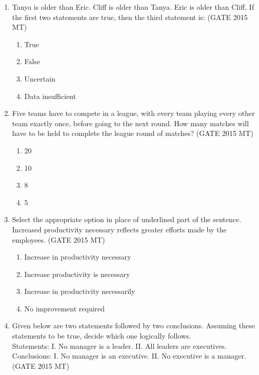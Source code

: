 \documentclass[12pt]{article}
\begin{document}
\begin{enumerate}
\item Tanya is older than Eric. Cliff is older than Tanya. Eric is older than Cliff. If the first two statements are true, then the third statement is: (GATE 2015 MT)

\vspace{0.5em}
\begin{enumerate}[label=(\alph*)]
    \item True
    \item False
    \item Uncertain
    \item Data insufficient
\end{enumerate}
\vspace{0.5em}

\item Five teams have to compete in a league, with every team playing every other team exactly once, before going to the next round. How many matches will have to be held to complete the league round of matches? (GATE 2015 MT)

\vspace{0.5em}
\begin{enumerate}[label=(\alph*)]
    \item 20
    \item 10
    \item 8
    \item 5
\end{enumerate}
\vspace{0.5em}

\item Select the appropriate option in place of underlined part of the sentence. Increased productivity necessary reflects greater efforts made by the employees. (GATE 2015 MT)

\vspace{0.5em}
\begin{enumerate}[label=(\alph*)]
    \item Increase in productivity necessary
    \item Increase productivity is necessary
    \item Increase in productivity necessarily
    \item No improvement required
\end{enumerate}
\vspace{0.5em}

\item Given below are two statements followed by two conclusions. Assuming these statements to be true, decide which one logically follows.\\
Statements: I. No manager is a leader. II. All leaders are executives.\\
Conclusions: I. No manager is an executive. II. No executive is a manager. (GATE 2015 MT)


\end{enumerate}
\end{document}
